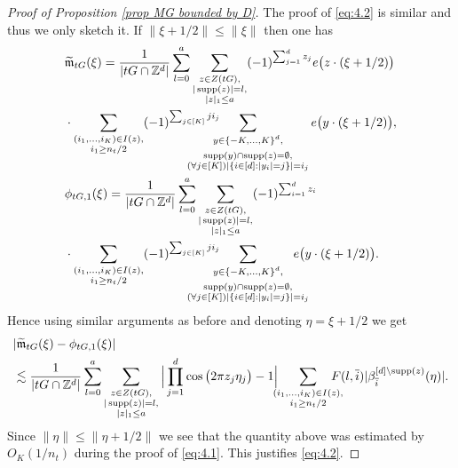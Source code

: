 \documentclass[a4paper,oneside, reqno]{amsart}
\numberwithin{equation}{section}
\theoremstyle{definition}%
\theoremstyle{definition}
\theoremstyle{definition}%
\theoremstyle{definition}
\newcommand{\Z}{\mathbb{Z}}
\DeclareMathOperator{\supp}{supp}
\begin{document}
\begin{proof}[Proof of Proposition \ref{prop MG bounded by D}]
\par The proof of  \eqref{eq:4.2} is similar and thus we only sketch it. If $\| \xi+1/2 \| \leq \| \xi \|$ then one has
\begin{align*}
&\widetilde{\mathfrak{m}}_{tG}(\xi)=\frac{1}{|tG \cap \Z^d|} \sum_{l=0}^a \sum_{\substack{z \in Z(tG),
\\ |\supp(z)|=l, \\ |z|_1 \le a
}}(-1)^{\sum_{j=1}^d z_j} e\big(z \cdot (\xi+1/2)\big) 
\\ 
&\cdot \sum_{\substack{(i_1,...,i_K) \in I(z), \\ 
i_1 \geq n_t/2
}} 
(-1)^{\sum_{j \in [K]} ji_j} \hspace{-1cm}
\sum_{\substack{y \in \{-K,...,K\}^d, \\ 
\\ \supp(y) \cap \supp(z)= \emptyset, 
\\
(\forall j \in [K]) |\{i \in [d]: |y_i|=j\}|=i_j
}} e\big(y \cdot (\xi+1/2) \big),
\\
&\phi_{tG,1}(\xi)=\frac{1}{|tG \cap \Z^d|} \sum_{l=0}^a \sum_{\substack{z \in Z(tG),
\\ |\supp(z)|=l, \\ |z|_1 \le a
}} (-1)^{\sum_{i=1}^d z_i} \\
&\cdot\sum_{\substack{(i_1,...,i_K) \in I(z), \\ 
i_1 \geq n_t/2
}} 
(-1)^{\sum_{j \in [K]} ji_j} \hspace{-1cm}
\sum_{\substack{y \in \{-K,...,K\}^d, \\ 
\\ \supp(y) \cap \supp(z)= \emptyset, 
\\
(\forall j \in [K]) |\{i \in [d]: |y_i|=j\}|=i_j
}} \hspace{-0.5cm} e\big(y \cdot (\xi+1/2) \big).
\end{align*}
Hence using similar arguments as before and denoting $\eta=\xi+1/2$ we get
\begin{align*}
&|\widetilde{\mathfrak{m}}_{tG}(\xi)-\phi_{tG,1}(\xi)| \\
&\lesssim \frac{1}{|tG \cap \Z^d|} \sum_{l=0}^a \sum_{\substack{z \in Z(tG),
\\ |\supp(z)|=l, \\ |z|_1 \le a
}} \Big| \prod_{j=1}^d \cos\big(2\pi z_j \eta_j\big)-1 \Big|
\hspace{-0.2cm}\sum_{\substack{(i_1,...,i_K) \in I(z), \\
i_1 \geq n_t/2
}} \hspace{-0.4cm}F(l, \overline{i}) |\beta_{\overline{i}}^{[d] \setminus  \supp(z)}(\eta)|.
\end{align*}
Since $\|\eta\|\le \|\eta+1/2\|$ we see that the quantity above was estimated by $O_K(1/n_t)$ during the proof of \eqref{eq:4.1}. This justifies \eqref{eq:4.2}. 




\end{proof}
\end{document}
